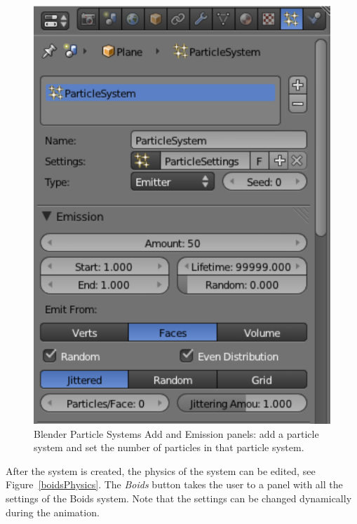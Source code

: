 \begin{figure}[htbp]
\begin{center}
\includegraphics[scale= 0.65]{figures/boidsCreatePS.pdf} 
\caption{Blender Particle Systems Add and Emission panels: add a particle system and set the number of particles in that particle system.}
\label{boidsCreatePS}
\end{center}
\end{figure}

After the system is created, the physics of the system can be edited, see Figure~\ref{boidsPhysics}. The \textit{Boids} button takes the user to a panel with all the settings of the Boids system.  Note that the settings can be changed dynamically during the animation. 

